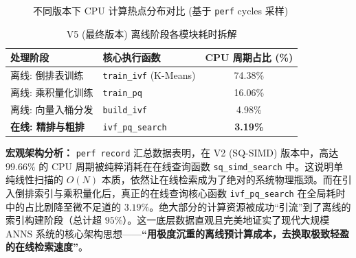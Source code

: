\documentclass[UTF8,a4paper,10pt]{ctexart}
\begin{document}
\begin{figure}[H]
    \centering
    \caption{不同版本下 CPU 计算热点分布对比 (基于 \texttt{perf} cycles 采样)}
    \label{fig:perf_cycles}
\end{figure}

\begin{table}[H]
    \centering
    \caption{V5 (最终版本) 离线阶段各模块耗时拆解}
    \label{tab:v5_offline}
    \begin{tabular}{llc}
    \toprule
    \textbf{处理阶段} & \textbf{核心执行函数} & \textbf{CPU 周期占比 (\%)} \\
    \midrule
    离线: 倒排表训练 & \texttt{train\_ivf} (K-Means) & 74.38\% \\
    离线: 乘积量化训练 & \texttt{train\_pq} & 16.06\% \\
    离线: 向量入桶分发 & \texttt{build\_ivf} & 4.98\% \\
    \midrule
    \textbf{在线: 精排与粗排} & \texttt{ivf\_pq\_search} & \textbf{3.19\%} \\
    \bottomrule
    \end{tabular}
\end{table}

\textbf{宏观架构分析：} 
\texttt{perf record} 汇总数据表明，在 V2 (SQ-SIMD) 版本中，高达 $99.66\%$ 的 CPU 周期被纯粹消耗在在线查询函数 \texttt{sq\_simd\_search} 中。这说明单纯线性扫描的 $O(N)$ 本质，依然让在线检索成为了绝对的系统物理瓶颈。而在引入倒排索引与乘积量化后，真正的在线查询核心函数 \texttt{ivf\_pq\_search} 在全局耗时中的占比剧降至微不足道的 $3.19\%$。绝大部分的计算资源被成功“引流”到了离线的索引构建阶段（总计超 $95\%$）。这一底层数据直观且完美地证实了现代大规模 ANNS 系统的核心架构思想——\textbf{“用极度沉重的离线预计算成本，去换取极致轻盈的在线检索速度”}。
\end{document}
